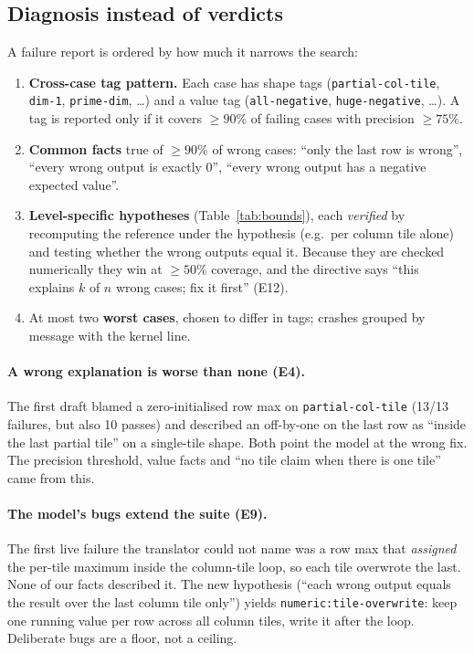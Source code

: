 \documentclass[11pt]{article}
\newcommand{\code}[1]{\texttt{#1}}
\newcommand{\E}[1]{E#1}
\begin{document}
\subsection{Diagnosis instead of verdicts}
\label{sec:diag}
A failure report is ordered by how much it narrows the search:
\begin{enumerate}
  \item \textbf{Cross-case tag pattern.} Each case has shape tags (\code{partial-col-tile},
        \code{dim-1}, \code{prime-dim}, \dots) and a value tag (\code{all-negative},
        \code{huge-negative}, \dots). A tag is reported only if it covers $\ge90\%$ of failing cases with
        precision $\ge75\%$.
  \item \textbf{Common facts} true of $\ge90\%$ of wrong cases: ``only the last row is wrong'', ``every
        wrong output is exactly 0'', ``every wrong output has a negative expected value''.
  \item \textbf{Level-specific hypotheses} (Table~\ref{tab:bounds}), each \emph{verified} by recomputing
        the reference under the hypothesis (e.g.\ per column tile alone) and testing whether the wrong
        outputs equal it. Because they are checked numerically they win at $\ge50\%$ coverage, and the
        directive says ``this explains $k$ of $n$ wrong cases; fix it first'' (\E{12}).
  \item At most two \textbf{worst cases}, chosen to differ in tags; crashes grouped by message with the
        kernel line.
\end{enumerate}

\paragraph{A wrong explanation is worse than none (\E{4}).} The first draft blamed a zero-initialised
row max on \code{partial-col-tile} (13/13 failures, but also 10 passes) and described an off-by-one
on the last row as ``inside the last partial tile'' on a single-tile shape. Both point the model at the
wrong fix. The precision threshold, value facts and ``no tile claim when there is one tile'' came from
this.

\paragraph{The model's bugs extend the suite (\E{9}).} The first live failure the translator could not
name was a row max that \emph{assigned} the per-tile maximum inside the column-tile loop, so each tile
overwrote the last. None of our facts described it. The new hypothesis (``each wrong output equals the
result over the last column tile only'') yields \code{numeric:tile-overwrite}: keep one running value
per row across all column tiles, write it after the loop. Deliberate bugs are a floor, not a ceiling.
\end{document}
